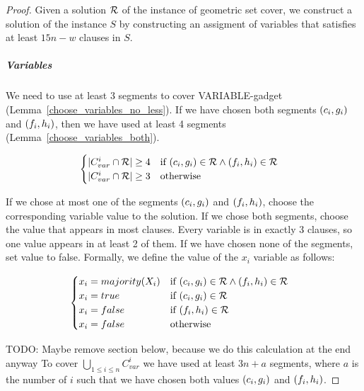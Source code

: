 \begin{proof}\leavevmode

Given a solution $\mathcal{R}$ of the instance of geometric set cover,
we construct a solution of the instance $S$ by constructing an
assigment of variables that satisfies at least $15n-w$ clauses in $S$.

\subparagraph{Variables}
We need to use at least 3 segments to cover VARIABLE-gadget
(Lemma~\ref{choose_variables_no_less}).
If we have chosen both segments $(c_i, g_i)$ and $(f_i, h_i)$,
then we have used at least 4 segments (Lemma~\ref{choose_variables_both}).


\begin{align}
	\begin{split}
	& \begin{cases}
	|C_{var}^i \cap \mathcal{R}| \ge 4 & \text{if}\ (c_i, g_i) \in \mathcal{R} \land (f_i, h_i) \in \mathcal{R} \\
	|C_{var}^i \cap \mathcal{R}| \ge 3 & \text{otherwise}
	\end{cases}
	\end{split}
\end{align}

If we chose at most one of the segments $(c_i, g_i)$ and $(f_i, h_i)$,
choose the corresponding variable value to the solution.
If we chose both segments,
choose the value that appears in most clauses.
Every variable is in exactly 3 clauses, so one value 
appears in at least 2 of them.
If we have chosen none of the segments, set value to false.
Formally, we define the value of the $x_i$ variable as follows:

\begin{align}
	\begin{split}
	\label{eqn:variable_assignment}
	& \begin{cases}
	x_i = majority(X_i) & \text{if}\ (c_i, g_i) \in \mathcal{R} \land (f_i, h_i) \in \mathcal{R} \\
	x_i = true & \text{if}\ (c_i, g_i) \in \mathcal{R} \\
	x_i = false & \text{if}\ (f_i, h_i) \in \mathcal{R} \\
	x_i = false & \text{otherwise}
	\end{cases}
	\end{split}
\end{align}

TODO: Maybe remove section below, because we do this calculation at the end anyway
To cover $\bigcup_{1 \le i \le n} C_{var}^i$
we have used at least $3n + a$ segments,
where $a$ is the number of $i$ such that we have chosen both
values $(c_i, g_i)$ and $(f_i, h_i)$.


\end{proof}
